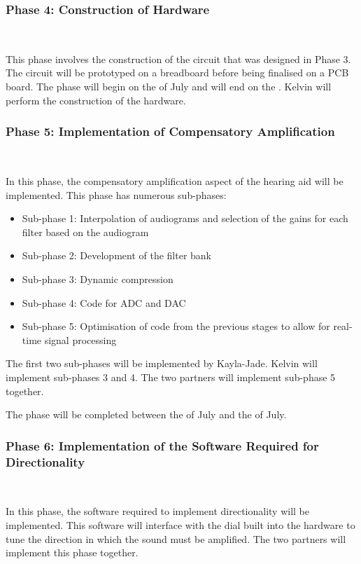 \documentclass[10pt,twocolumn]{witseiepaper}
\begin{document}
\subsubsection*{Phase 4: Construction of Hardware } $    $

This phase involves the construction of the circuit that was designed in Phase 3. The circuit will be prototyped on a breadboard before being finalised on a PCB board. The phase will begin on the  of July and will end on the . Kelvin will perform the construction of the hardware.

\subsubsection*{Phase 5: Implementation of Compensatory Amplification} $    $

In this phase, the compensatory amplification aspect of the hearing aid will be implemented. This phase has numerous sub-phases:
\begin{itemize}
	\item Sub-phase 1: Interpolation of audiograms and selection of the gains for each filter based on the audiogram
	\item Sub-phase 2: Development of the filter bank
	\item Sub-phase 3: Dynamic compression
	\item Sub-phase 4: Code for ADC and DAC
	\item Sub-phase 5: Optimisation of code from the previous stages to allow for real-time signal processing
\end{itemize}

The first two sub-phases will be implemented by Kayla-Jade. Kelvin will implement sub-phases 3 and 4. The two partners will implement sub-phase 5 together.

The phase will be completed between the  of July and the  of July.


\subsubsection*{Phase 6: Implementation of the Software Required for Directionality} $    $

In this phase, the software required to implement directionality will be implemented. This software will interface with the dial built into the hardware to tune the direction in which the sound must be amplified. The two partners will implement this phase together. 
\end{document}
